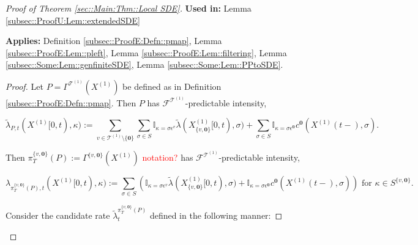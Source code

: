 \documentclass[12pt]{article}
\newcommand{\mb}{\mathbb}
\newcommand{\mc}{\mathcal}
\newcommand{\te}{\text}
\newcommand{\ep}{\epsilon}
\newcommand{\tr}{\textcolor{red}}
\newcommand{\usein}{\textbf{Used in: }}
\newcommand{\app}{\textbf{Applies: }}
\newcommand{\defeq}{:=}								%
\renewcommand{\root}{\mathbf{0}}				%
\renewcommand{\v}{v}							%
\renewcommand{\S}{S}							%
\newcommand{\s}{\sigma}							%
\newcommand{\ev}{\ep}							%
\newcommand{\T}{T}								%
\renewcommand{\t}{t}							%
\newcommand{\proj}{\pi}							%
\newcommand{\F}{\mc{F}}							%
\newcommand{\X}{X}								%
\newcommand{\IGr}{c}							%
\newcommand{\vind}[1]{^{#1}}					%
\newcommand{\carp}[1]{^{#1}}					%
\newcommand{\vsi}[1]{^{#1}}						%
\newcommand{\cind}[1]{_{#1}}					%
\newcommand{\tp}[1]{(#1)}						%
\newcommand{\tip}[1]{#1}						%
\newcommand{\ts}[1]{_{#1}}						%
\newcommand{\tree}{\mc{T}}						%
\newcommand{\sln}[1]{^{(#1)}}					%
\newcommand{\rate}{\lambda}						%
\newcommand{\alt}[1]{\widetilde{#1}}			%
\newcommand{\pra}[1]{_{#1}}						%
\newcommand{\pmap}{\Gamma}						%
\renewcommand{\mark}{\kappa}					%
\newcommand{\rp}{P}								%
\newcommand{\crate}{\alt{\lambda}}				%
\newcommand{\prats}[2]{_{#1,#2}}				%
\begin{document}
\begin{proof}[Proof of Theorem \ref{sec::Main:Thm::Local SDE}]
\usein Lemma \ref{subsec::ProofU:Lem::extendedSDE}

\app Definition \ref{subsec::ProofE:Defn::pmap}, Lemma \ref{subsec::ProofE:Lem::pleft}, Lemma \ref{subsec::ProofE:Lem::filtering}, Lemma \ref{subsec::Some:Lem::genfiniteSDE}, Lemma \ref{subsec::Some:Lem::PPtoSDE}.

\begin{proof}
Let \(\rp = \pmap\vind{\tree\sln{1}}(\X\sln{1})\) be defined as in Definition \ref{subsec::ProofE:Defn::pmap}. Then \(\rp\) has \(\F\vsi{\tree\sln{1}}\)-predictable intensity,

\[\crate\prats{\rp}{\t}(\X\sln{1}\tip{[0,\t)},\mark) \defeq \sum_{\v\in \tree\sln{1}\setminus\{\root\}}\sum_{\s\in \S} \mb{I}_{\mark = \s\ev\vind{\v}}\crate(\X\sln{1}\cind{\{\v,\root\}}\tip{[0,\t)},\s) + \sum_{\s\in\S}\mb{I}_{\mark = \s\ev\vind{\root}}\IGr\vind{\root}(\X\sln{1}\tp{\t-},\s).\]

Then \(\proj\vsi{\{\v,\root\}}\ts{\T}(\rp)\defeq \pmap\vind{\{\v,\root\}}(\X\sln{1})\) \tr{notation?} has \(\F\vsi{\tree\sln{1}}\)-predictable intensity,

\[\rate\prats{\proj\vsi{\{\v,\root\}}\ts{\T}(\rp)}{\t}(\X\sln{1}\tip{[0,\t)},\mark) \defeq \sum_{\s\in \S} \left(\mb{I}_{\mark = \s\ev\vind{\v}}\crate(\X\sln{1}\cind{\{\v,\root\}}\tip{[0,\t)},\s) + \mb{I}_{\mark = \s\ev\vind{\root}}\IGr\vind{\root}(\X\sln{1}\tp{\t-},\s)\right)\te{ for } \kappa \in \S\carp{\{\v,\root\}}.\]

Consider the candidate rate \(\crate\vind{\proj\vsi{\{\v,\root\}}\ts{\T}(\rp)}\ts{\t}\) defined in the following manner:


\end{proof}
\end{proof}
\end{document}
